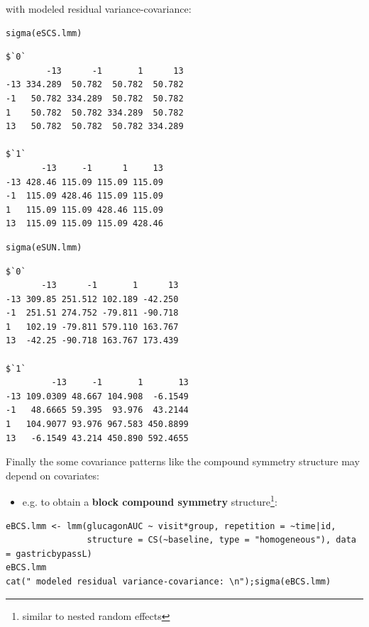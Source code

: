 \documentclass[12pt]{article}
\begin{document}
with modeled residual variance-covariance:

\bigskip

\begin{minipage}{0.47\linewidth}
\lstset{language=r,label= ,caption= ,captionpos=b,numbers=none}
\begin{lstlisting}
sigma(eSCS.lmm)
\end{lstlisting}

\begin{verbatim}
$`0`
        -13      -1       1      13
-13 334.289  50.782  50.782  50.782
-1   50.782 334.289  50.782  50.782
1    50.782  50.782 334.289  50.782
13   50.782  50.782  50.782 334.289

$`1`
       -13     -1      1     13
-13 428.46 115.09 115.09 115.09
-1  115.09 428.46 115.09 115.09
1   115.09 115.09 428.46 115.09
13  115.09 115.09 115.09 428.46
\end{verbatim}
\end{minipage}
\begin{minipage}{0.47\linewidth}
\lstset{language=r,label= ,caption= ,captionpos=b,numbers=none}
\begin{lstlisting}
sigma(eSUN.lmm)
\end{lstlisting}

\begin{verbatim}
$`0`
       -13      -1       1      13
-13 309.85 251.512 102.189 -42.250
-1  251.51 274.752 -79.811 -90.718
1   102.19 -79.811 579.110 163.767
13  -42.25 -90.718 163.767 173.439

$`1`
         -13     -1       1       13
-13 109.0309 48.667 104.908  -6.1549
-1   48.6665 59.395  93.976  43.2144
1   104.9077 93.976 967.583 450.8899
13   -6.1549 43.214 450.890 592.4655
\end{verbatim}
\end{minipage}

\clearpage

\noindent Finally the some covariance patterns like the compound
symmetry structure may depend on covariates:
\begin{itemize}
\item e.g. to obtain a \textbf{block compound symmetry} structure\footnote{similar to
nested random effects}:
\end{itemize}
\lstset{language=r,label= ,caption= ,captionpos=b,numbers=none}
\begin{lstlisting}
eBCS.lmm <- lmm(glucagonAUC ~ visit*group, repetition = ~time|id,
                structure = CS(~baseline, type = "homogeneous"), data = gastricbypassL)
eBCS.lmm
cat(" modeled residual variance-covariance: \n");sigma(eBCS.lmm)
\end{lstlisting}
\end{document}
